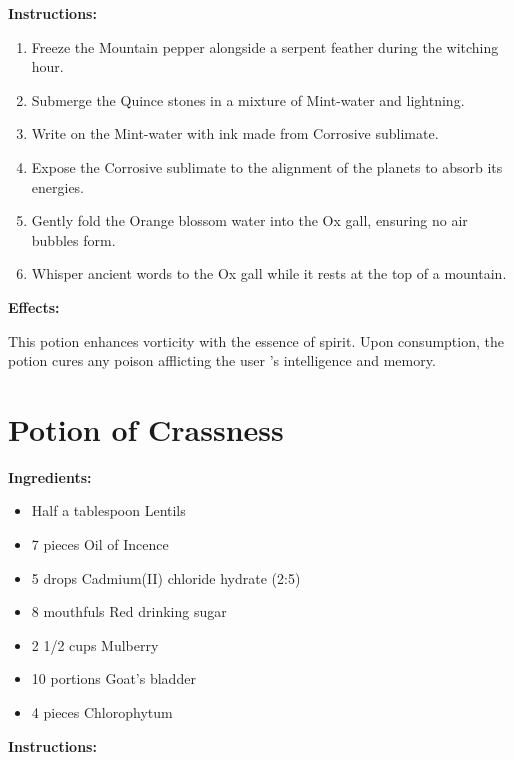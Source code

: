 \documentclass{article}
\begin{document}
\textbf{Instructions:}

\begin{enumerate}
  \item Freeze the Mountain pepper alongside a serpent feather during the witching hour.
  \item Submerge the Quince stones in a mixture of Mint-water and lightning.
  \item Write on the Mint-water with ink made from Corrosive sublimate.
  \item Expose the Corrosive sublimate to the alignment of the planets to absorb its energies.
  \item Gently fold the Orange blossom water into the Ox gall, ensuring no air bubbles form.
  \item Whisper ancient words to the Ox gall while it rests at the top of a mountain.
\end{enumerate}

\textbf{Effects:}

This potion enhances vorticity with the essence of spirit. Upon consumption, the potion cures any poison afflicting the user 's intelligence and memory.

\newpage
\section*{Potion of Crassness}

\textbf{Ingredients:}

\begin{itemize}
  \item Half a tablespoon Lentils
  \item 7 pieces Oil of Incence
  \item 5 drops Cadmium(II) chloride hydrate (2:5)
  \item 8 mouthfuls Red drinking sugar
  \item 2 1/2 cups Mulberry
  \item 10 portions Goat's bladder
  \item 4 pieces Chlorophytum
\end{itemize}

\textbf{Instructions:}
\end{document}

